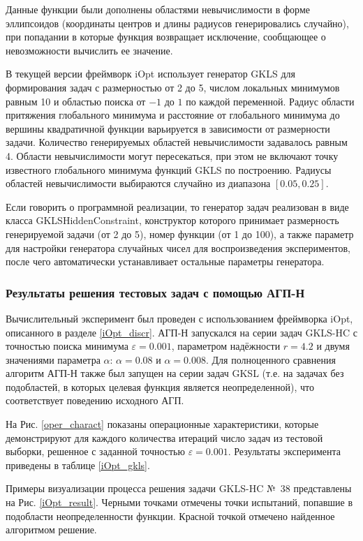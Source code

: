 \documentclass[a4paper,12pt,russian]{article}
\begin{document}
Данные функции были дополнены областями невычислимости в форме эллипсоидов (координаты центров и длины радиусов генерировались случайно), при попадании в которые функция возвращает исключение, сообщающее о невозможности вычислить ее значение.

В текущей версии фреймворк iOpt использует генератор GKLS для формирования задач с размерностью от 2 до 5, числом локальных минимумов равным 10 и областью поиска от $-1$ до $1$ по каждой переменной. Радиус области притяжения глобального минимума и расстояние от глобального минимума до вершины квадратичной функции варьируется в зависимости от размерности задачи. Количество генерируемых областей невычислимости задавалось равным 4. Области невычислимости могут пересекаться, при этом не включают точку известного глобального минимума функций GKLS по построению. Радиусы областей невычислимости выбираются случайно из диапазона $[0.05, 0.25]$.

Если говорить о программной реализации, то генератор задач реализован в виде класса GKLSHiddenConstraint, конструктор которого принимает размерность генерируемой задачи (от 2 до 5), номер функции (от 1 до 100), а также параметр для настройки генератора случайных чисел для воспроизведения экспериментов, после чего автоматически устанавливает остальные параметры генератора.

\subsubsection{Результаты решения тестовых задач с помощью АГП-Н}

Вычислительный эксперимент был проведен с использованием фреймворка iOpt, описанного в разделе \ref{iOpt_discr}. АГП-Н запускался на серии задач GKLS-HC с точностью поиска минимума $\varepsilon = 0.001$, параметром надёжности $r = 4.2$ и двумя значениями параметра $\alpha$: $\alpha = 0.08$ и $\alpha = 0.008$. Для полноценного сравнения алгоритм АГП-Н также был запущен на серии задач GKSL (т.е. на задачах без подобластей, в которых целевая функция является неопределенной), что соответствует поведению исходного АГП.

На Рис. \ref{oper_charact} показаны операционные характеристики, которые демонстрируют для каждого количества итераций число задач из тестовой выборки, решенное с заданной точностью $\varepsilon = 0.001$. Результаты эксперимента приведены в таблице \ref{iOpt_gkls}. 

Примеры визуализации процесса решения задачи GKLS-HC №~38 представлены на Рис. \ref{iOpt_result}. Черными точками отмечены точки испытаний, попавшие в подобласти неопределенности функции. Красной точкой отмечено найденное алгоритмом решение.
\end{document}
